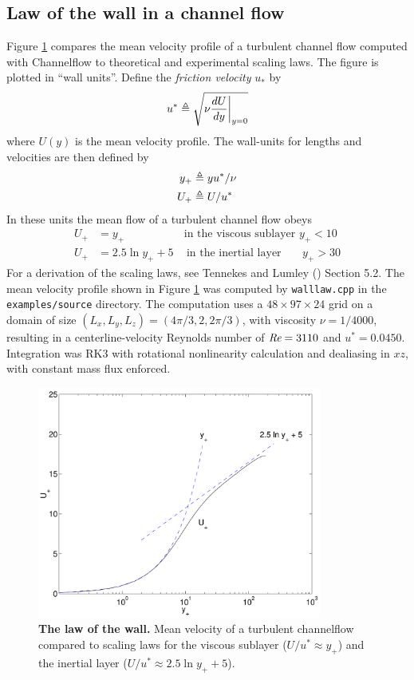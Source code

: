 \documentclass{article}[12pt]
\begin{document}
\subsection{Law of the wall in a channel flow}

Figure \ref{fig:walllaw} compares the mean velocity profile of a turbulent
channel flow computed with Channelflow to theoretical and experimental
scaling laws. The figure is plotted in ``wall units''. Define the
{\em friction velocity} $u_*$ by
\begin{align}
u^* \triangleq \sqrt{\nu \frac{dU}{dy} \bigg|_{y=0}}
\end{align}
where $U(y)$ is the mean velocity profile. The wall-units for lengths
and velocities are then defined by
\begin{align}
y_+ &\triangleq y u^*/ \nu \\
U_+ &\triangleq U/u^*
\end{align}
In these units the mean flow of a turbulent channel flow obeys
\begin{align}
U_+ &= y_+  \qquad \quad \qquad \text { in the viscous sublayer } y_+ < 10 \\
U_+ &= 2.5 \ln y_+ + 5 \;\;\; \text { in the inertial layer } \quad \; \; y_+ > 30
\end{align}
For a derivation of the scaling laws, see Tennekes and Lumley
(\cite{Tennekes72}) Section 5.2. The mean velocity profile shown in
Figure \ref{fig:walllaw} was computed by {\tt walllaw.cpp} in the {\tt
examples/source} directory. The computation uses a $48 \times 97
\times 24$ grid on a domain of size $(L_x, L_y, L_z) =
(4\pi/3,2,2\pi/3)$, with viscosity $\nu = 1/4000$, resulting in a
centerline-velocity Reynolds number of $\mbox{{\it Re}} = 3110$ and $u^* = 0.0450$.
Integration was RK3 with rotational nonlinearity calculation and
dealiasing in $xz$, with constant mass flux enforced.

\begin{figure}
\centering
\includegraphics[height=3.0in]{walllaw}
\caption{{\bf The law of the wall.} Mean velocity of a turbulent channelflow
compared to scaling laws for the viscous sublayer ($U/u^* \approx y_+$) and
the inertial layer ($U/u^* \approx 2.5 \ln y_+ + 5$).}
\label{fig:walllaw}
\end{figure}
\end{document}
